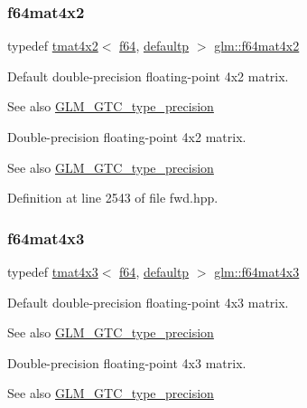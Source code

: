 \subsubsection{\texorpdfstring{f64mat4x2}{f64mat4x2}}
{\footnotesize\ttfamily typedef \mbox{\hyperlink{structglm_1_1tmat4x2}{tmat4x2}}$<$ \mbox{\hyperlink{group__gtc__type__precision_ga2bba392e555124b36cde6abba349bab3}{f64}}, \mbox{\hyperlink{namespaceglm_a0f04f086094c747d227af4425893f545a9d21ccd8b5a009ec7eb7677befc3bf51}{defaultp}} $>$ \mbox{\hyperlink{group__gtc__type__precision_ga13dbaf75e4f1b18c35d2837067a14ce9}{glm\+::f64mat4x2}}}

Default double-\/precision floating-\/point 4x2 matrix. \begin{DoxySeeAlso}{See also}
\mbox{\hyperlink{group__gtc__type__precision}{G\+L\+M\+\_\+\+G\+T\+C\+\_\+type\+\_\+precision}}
\end{DoxySeeAlso}
Double-\/precision floating-\/point 4x2 matrix. \begin{DoxySeeAlso}{See also}
\mbox{\hyperlink{group__gtc__type__precision}{G\+L\+M\+\_\+\+G\+T\+C\+\_\+type\+\_\+precision}} 
\end{DoxySeeAlso}


Definition at line 2543 of file fwd.\+hpp.

\mbox{\label{group__gtc__type__precision_gab10a195a85f65da47bf70438f57a8a3c}} 
\subsubsection{\texorpdfstring{f64mat4x3}{f64mat4x3}}
{\footnotesize\ttfamily typedef \mbox{\hyperlink{structglm_1_1tmat4x3}{tmat4x3}}$<$ \mbox{\hyperlink{group__gtc__type__precision_ga2bba392e555124b36cde6abba349bab3}{f64}}, \mbox{\hyperlink{namespaceglm_a0f04f086094c747d227af4425893f545a9d21ccd8b5a009ec7eb7677befc3bf51}{defaultp}} $>$ \mbox{\hyperlink{group__gtc__type__precision_gab10a195a85f65da47bf70438f57a8a3c}{glm\+::f64mat4x3}}}

Default double-\/precision floating-\/point 4x3 matrix. \begin{DoxySeeAlso}{See also}
\mbox{\hyperlink{group__gtc__type__precision}{G\+L\+M\+\_\+\+G\+T\+C\+\_\+type\+\_\+precision}}
\end{DoxySeeAlso}
Double-\/precision floating-\/point 4x3 matrix. \begin{DoxySeeAlso}{See also}
\mbox{\hyperlink{group__gtc__type__precision}{G\+L\+M\+\_\+\+G\+T\+C\+\_\+type\+\_\+precision}} 
\end{DoxySeeAlso}


